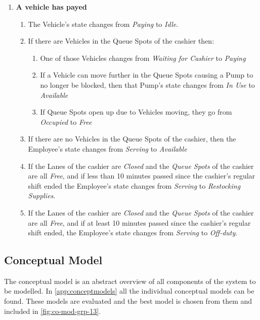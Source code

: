 \begin{enumerate}
	\item \textbf{A vehicle has payed}
	\begin{enumerate}
		\item The Vehicle's state changes from \textit{Paying} to \textit{Idle}.
		\item If there are Vehicles in the Queue Spots of the cashier then:
		\begin{enumerate}
			\item One of those Vehicles changes from \textit{Waiting for Cashier} to \textit{Paying}
			\item If a Vehicle can move further in the Queue Spots causing a Pump to no longer be blocked, then that Pump's state changes from \textit{In Use} to \textit{Available}
			\item If Queue Spots open up due to Vehicles moving, they go from \textit{Occupied} to \textit{Free}
		\end{enumerate}
		\item If there are no Vehicles in the Queue Spots of the cashier, then the Employee's state changes from \textit{Serving} to \textit{Available}
		\item If the Lanes of the cashier are \textit{Closed} and the \textit{Queue Spots} of the cashier are all \textit{Free}, and if less than 10 minutes passed since the cashier's regular shift ended the Employee's state changes from \textit{Serving} to \textit{Restocking Supplies}.
		\item If the Lanes of the cashier are \textit{Closed} and the \textit{Queue Spots} of the cashier are all \textit{Free}, and if at least 10 minutes passed since the cashier's regular shift ended, the Employee's state changes from \textit{Serving} to \textit{Off-duty}.
	\end{enumerate}
\end{enumerate}

\subsection{Conceptual Model}
The conceptual model is an abstract overview of all components of the system to be modelled.
In \autoref{app:conceptmodels} all the individual conceptual models can be found. 
These models are evaluated and the best model is chosen from them and included in \autoref{fig:co-mod-grp-13}.

